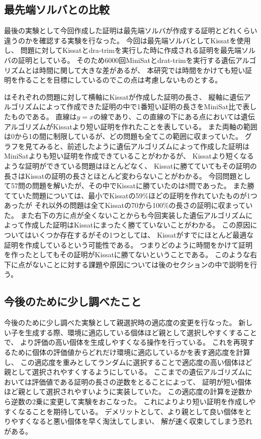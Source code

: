 \subsection{最先端ソルバとの比較}

最後の実験として今回作成した証明は最先端ソルバが作成する証明とどれくらい違うのかを確認する実験を行なった。
今回は最先端ソルバとしてKissatを使用し、
問題に対してKissatとdra-trimを実行した時に作成される証明を最先端ソルバの証明としている。
そのため6000回MiniSatとdrat-trimを実行する遺伝アルゴリズムとは時間に関して大きな差があるが、
本研究では時間をかけても短い証明を作ることを目標にしているのでこの点は考慮しないものとする。


はそれぞれの問題に対して横軸にKissatが作成した証明の長さ、
縦軸に遺伝アルゴリズムによって作成できた証明の中で1番短い証明の長さをMiniSat比で表したものである。
直線は$y=x$の線であり、この直線の下にある点においては遺伝アルゴリズムがKissatより短い証明を作れたことを表している。
また両軸の範囲は0から1の間に制限しているが、どの問題も全てこの範囲に収まっていた。
グラフを見てみると、前述したように遺伝アルゴリズムによって作成した証明はMiniSatよりも短い証明を作成できていることがわかるが、
Kissatより短くなるような証明ができている問題はほとんどなく、
Kissatに勝てていてもその証明の長さはKissatの証明の長さとほとんど変わらないことがわかる。
今回問題として57問の問題を解いたが、その中でKissatに勝ていたのは8問であった。
また勝てていた問題については、最小でKissatの59\%ほどの証明を作れていたものが1つあったが
それ以外の問題は全てKissatの70から100\%の長さの証明に収まっていた。
また右下の方に点が全くないことからも今回実装した遺伝アルゴリズムによって作成した証明はKissatにまったく勝てていないことがわかる。
この原因についてはいくつか存在するがその1つとしては、
Kissatがすでにほとんど最適な証明を作成しているという可能性である。
つまりどのように時間をかけて証明を作ったとしてもその証明がKissatに勝てないということである。
このような右下に点がないことに対する課題や原因については後のセクションの中で説明を行う。

\subsection{今後のために少し調べたこと}

今後のために少し調べた実験として親選択時の適応度の変更を行なった。
新しい子を生成する際、環境に適応している個体ほど親として選択しやすくすることで、
より評価の高い個体を生成しやすくなる操作を行っている。
これを再現するために個体の評価値からどれだけ環境に適応しているかを表す適応度を計算し、
この適応度を重みとしてランダムに選択することで適応度の高い個体ほど親として選択されやすくするようにしている。
ここまでの遺伝アルゴリズムにおいては評価値である証明の長さの逆数をとることによって、
証明が短い個体ほど親として選択されやすいように実装していた。
この適応度の計算を逆数から逆数の2乗に変更して実験をおこなった。
これによりより短い証明を作成しやすくなることを期待している。
デメリットとして、より親として良い個体をとりやすくなると悪い個体を早く淘汰してしまい、
解が速く収束してしまう恐れがある。

